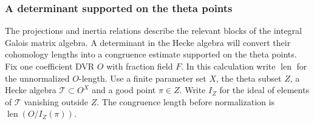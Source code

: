 \subsubsection*{A determinant supported on the theta points}
\label{subsec:congruence-determinant}
\hypertarget{source-congruence-determinant}{}

The projections and inertia relations describe the relevant blocks of the integral Galois matrix algebra. A determinant in the Hecke algebra will convert their cohomology lengths into a congruence estimate supported on the theta points. Fix one coefficient DVR \(O\) with
fraction field \(F\). In this calculation write
\(\operatorname{len}\) for the unnormalized \(O\)-length.
Use a finite parameter set \(X\), the theta subset \(Z\), a
Hecke algebra \(\mathcal T\subset O^X\) and a good point
\(\pi\in Z\). Write \(I_Z\) for the ideal of elements of
\(\mathcal T\) vanishing outside \(Z\). The congruence
length before normalization is
\(\operatorname{len}(O/I_Z(\pi))\).

